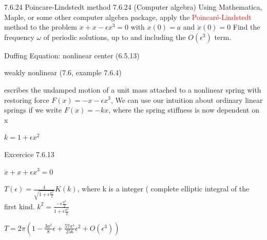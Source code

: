 \documentclass[9pt,aspectratio=43,mathserif,table]{beamer}
\begin{document}
\begin{frame}[label=current]{7.6.24 Poincare-Lindstedt method}
7.6.24
(Computer algebra) Using Mathematica, Maple, or some other computer
algebra package, apply the \textcolor{red}{Poincaré-Lindstedt} method to the problem
$\ddot x + x - \epsilon x^3 = 0$ with $x(0) = a$ and $\dot x(0) = 0$
Find the frequency $\omega $ of periodic
solutions, up to and including the  $O (\epsilon^3)$  term.

\medskip

Duffing Equation: nonlinear center (6.5.13)

weakly nonlinear (7.6, example 7.6.4)

escribes the undamped motion of a unit mass attached to a nonlinear spring with restoring force 
$F(x) = -x-\epsilon x^3$, We can use our intuition about ordinary linear springs if we
write $F(x) = - kx$, where the spring stiffness is now dependent on x 

$k = 1 + \epsilon x^2$

Excercice 7.6.13 

$\ddot x + x + \epsilon x^3 = 0$ 

$T(\epsilon) = \frac{ 4}{\sqrt{1+\epsilon \frac{ a^2}{2} }} K(k)$, where k is a integer ( complete elliptic integral of the first kind. $k^2 = \frac{-\epsilon \frac{ a^2}{2}}{1+\epsilon \frac{ a^2}{2}}$

$T = 2\pi (1 - \frac{ 3a^2}{8}\epsilon + \frac{ 57 a^4}{256}\epsilon^2 + O(\epsilon ^3)) $

\end{frame}
\end{document}
